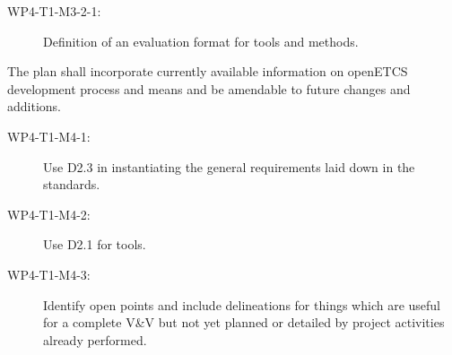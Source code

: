 \documentclass{template/openetcs_report}
\begin{document}
{{\begin{description}
\begin{description}
  \item[WP4-T1-M3-2-1:] Definition of an evaluation format for tools
    and methods.
  \end{description}
\item[WP4-T1-G4:] The plan shall incorporate currently available
  information on openETCS development process and means and be
  amendable to future changes and additions.
  \begin{description}
  \item[WP4-T1-M4-1:] Use D2.3 in instantiating the general
    requirements laid down in the standards.
  \item[WP4-T1-M4-2:] Use D2.1 for tools.
  \item[WP4-T1-M4-3:] Identify open points and include delineations
    for things which are useful for a complete V\&V but not yet
    planned or detailed by project activities already performed.
  \end{description}
\end{description}
}
}
\end{document}
